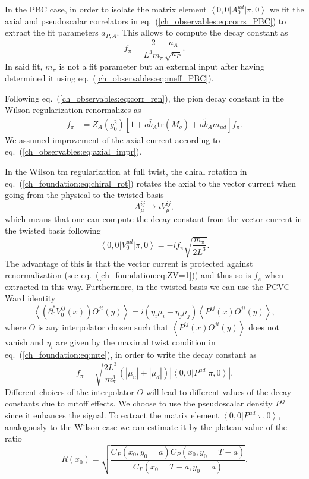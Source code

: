 In the PBC case, in order to isolate the matrix element $\left<0,0\right|A_0^{ud}\left|\pi,0\right>$ we fit the axial and pseudoscalar correlators in eq.~(\ref{ch_observables:eq:corrs_PBC}) to extract the fit parameters $a_{P,A}$. This allows to compute the decay constant as
\begin{equation}
f_{\pi}=\frac{2}{L^3m_{\pi}}\frac{a_A}{\sqrt{a_P}}.
\end{equation}
In said fit, $m_{\pi}$ is not a fit parameter but an external input after having determined it using eq.~(\ref{ch_observables:eq:meff_PBC}).

Following eq.~(\ref{ch_observables:eq:corr_ren}), the pion decay constant in the Wilson regularization renormalizes as
\begin{align}
f_{\pi}&=Z_A(g_0^2)\left[1+a\bar{b}_A{\textrm{tr}}\left(M_q\right)+a\tilde{b}_Am_{ud}\right]f_{\pi}.
\end{align}
We assumed improvement of the axial current according to eq.~(\ref{ch_observables:eq:axial_impr}).

In the Wilson tm regularization at full twist, the chiral rotation in eq.~(\ref{ch_foundation:eq:chiral_rot}) rotates the axial to the vector current when going from the physical to the twisted basis
\begin{equation}
A_{\mu}^{ij}\rightarrow iV_{\mu}^{ij},
\end{equation}
which means that one can compute the decay constant from the vector current in the twisted basis following
\begin{equation}
\label{ch_observables:eq:vector_matrix_element}
\left<0,0\right|V_0^{ud}\left|\pi,0\right>=-if_{\pi}\sqrt{\frac{m_{\pi}}{2L^3}}.
\end{equation}
The advantage of this is that the vector current is protected against renormalization (see eq.~(\ref{ch_foundation:eq:ZV=1})) and thus so is $f_{\pi}$ when extracted in this way. Furthermore, in the twisted basis we can use the PCVC Ward identity
\begin{equation}
\left<\left(\partial_0^*V_0^{ij}(x)\right)O^{ji}(y)\right>=i\left(\eta_i\mu_i-\eta_{j}\mu_{j}\right)\left<P^{ij}(x)O^{ji}(y)\right>,
\end{equation}
where $O$ is any interpolator chosen such that $\left<P^{ij}(x)O^{ji}(y)\right>$ does not vanish and $\eta_i$ are given by the maximal twist condition in eq.~(\ref{ch_foundation:eq:mte}), in order to write the decay constant as
\begin{equation}
\label{ch_observables:eq:f_OBC}
f_{\pi}=\sqrt{\frac{2L^3}{m_{\pi}^3}}\left(|\mu_u|+|\mu_{d}|\right)\left|\left<0,0\right|P^{ud}\left|\pi,0\right>\right|.
\end{equation}
Different choices of the interpolator $O$ will lead to different values of the decay constants due to cutoff effects. We choose to use the pseudoscalar density $P^{ij}$ since it enhances the signal. To extract the matrix element $\left<0,0\right|P^{ud}\left|\pi,0\right>$, analogously to the Wilson case we can estimate it by the plateau value of the ratio
\begin{equation}
R(x_0)=\sqrt{\frac{C_P(x_0,y_0=a)C_P(x_0,y_0=T-a)}{C_P(x_0=T-a,y_0=a)}}.
\end{equation}

